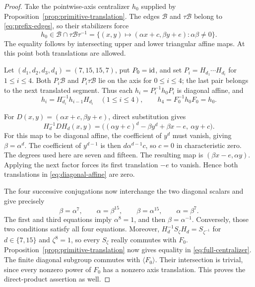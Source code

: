 \begin{proof}
Take the pointwise-axis centralizer $h_0$ supplied by
Proposition~\ref{prop:primitive-translation}.
The edges $\mathcal B$ and $\tau\mathcal B$ belong to
\eqref{eq:prefix-edges}, so their stabilizers force
\begin{equation}\label{eq:diagonal-affine}
  h_0\in\mathcal B\cap\tau\mathcal B\tau^{-1}
  =\{(x,y)\mapsto(\alpha x+c,\beta y+e):\alpha\beta\ne0\}.
\end{equation}
The equality follows by intersecting upper and lower triangular
affine maps. At this point both translations are allowed.

Let $(d_1,d_2,d_3,d_4)=(7,15,15,7)$, put $P_0=\mathrm{id}$, and set
$P_i=H_{d_1}\cdots H_{d_i}$ for $1\le i\le4$.
Both $P_i\mathcal B$ and $P_i\tau\mathcal B$ lie on the axis
for $0\le i\le4$; the last pair belongs to the next translated
segment. Thus each
$h_i=P_i^{-1}h_0P_i$ is diagonal affine, and
\[
  h_i=H_{d_i}^{-1}h_{i-1}H_{d_i}\quad(1\le i\le4),
  \qquad h_4=F_0^{-1}h_0F_0=h_0.
\]

For $D(x,y)=(\alpha x+c,\beta y+e)$, direct substitution gives
\begin{equation}\label{eq:affine-conjugation}
  H_d^{-1}DH_d(x,y)
  =\bigl((\alpha y+c)^d-\beta y^d+\beta x-e,\ \alpha y+c\bigr).
\end{equation}
For this map to be diagonal affine, the coefficient of $y^d$
must vanish, giving $\beta=\alpha^d$. The coefficient of $y^{d-1}$
is then $d\alpha^{d-1}c$, so $c=0$ in characteristic zero.
The degrees used here are seven and fifteen.
The resulting map is $(\beta x-e,\alpha y)$.
Applying the next factor forces its first translation $-e$ to
vanish. Hence both translations in \eqref{eq:diagonal-affine}
are zero.

The four successive conjugations now interchange the two diagonal
scalars and give precisely
\begin{equation}\label{eq:scalar-equations}
  \beta=\alpha^7,\qquad
  \alpha=\beta^{15},\qquad
  \beta=\alpha^{15},\qquad
  \alpha=\beta^7.
\end{equation}
The first and third equations imply $\alpha^8=1$, and then
$\beta=\alpha^{-1}$. Conversely, those two conditions satisfy
all four equations. Moreover,
$H_d^{-1}S_\zeta H_d=S_{\zeta^{-1}}$ for
$d\in\{7,15\}$ and $\zeta^8=1$, so every $S_\zeta$ really
commutes with $F_0$.
Proposition~\ref{prop:primitive-translation} now gives equality
in \eqref{eq:full-centralizer}.
The finite diagonal subgroup commutes with $\langle F_0\rangle$.
Their intersection is trivial, since every nonzero power of $F_0$
has a nonzero axis translation. This proves the direct-product
assertion as well.
\end{proof}

